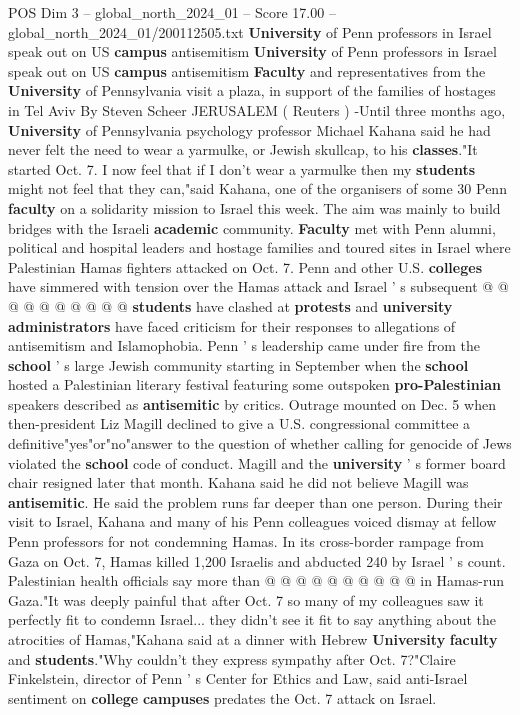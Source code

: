 \begin{textsample}{POS Dim 3 – global\_north\_2024\_01 – Score 17.00 – global\_north\_2024\_01/200112505.txt}  \label{ex:f3_pos_240}
\textbf{University} of Penn professors in Israel speak out on US \textbf{campus} antisemitism \textbf{University} of Penn professors in Israel speak out on US \textbf{campus} antisemitism \textbf{Faculty} and representatives from the \textbf{University} of Pennsylvania visit a plaza, in support of the families of hostages in Tel Aviv By Steven Scheer JERUSALEM ( Reuters ) -Until three months ago, \textbf{University} of Pennsylvania psychology professor Michael Kahana said he had never felt the need to wear a yarmulke, or Jewish skullcap, to his \textbf{classes}."It started Oct. 7.
I now feel that if I don't wear a yarmulke then my \textbf{students} might not feel that they can,"said Kahana, one of the organisers of some 30 Penn \textbf{faculty} on a solidarity mission to Israel this week.
The aim was mainly to build bridges with the Israeli \textbf{academic} community. \textbf{Faculty} met with Penn alumni, political and hospital leaders and hostage families and toured sites in Israel where Palestinian Hamas fighters attacked on Oct. 7.
Penn and other U.S. \textbf{colleges} have simmered with tension over the Hamas attack and Israel ' s subsequent @ @ @ @ @ @ @ @ @ @ \textbf{students} have clashed at \textbf{protests} and \textbf{university} \textbf{administrators} have faced criticism for their responses to allegations of antisemitism and Islamophobia.
Penn ' s leadership came under fire from the \textbf{school} ' s large Jewish community starting in September when the \textbf{school} hosted a Palestinian literary festival featuring some outspoken \textbf{pro-Palestinian} speakers described as \textbf{antisemitic} by critics.
Outrage mounted on Dec. 5 when then-president Liz Magill declined to give a U.S. congressional committee a definitive"yes"or"no"answer to the question of whether calling for genocide of Jews violated the \textbf{school} code of conduct.
Magill and the \textbf{university} ' s former board chair resigned later that month.
Kahana said he did not believe Magill was \textbf{antisemitic}.
He said the problem runs far deeper than one person.
During their visit to Israel, Kahana and many of his Penn colleagues voiced dismay at fellow Penn professors for not condemning Hamas.
In its cross-border rampage from Gaza on Oct. 7, Hamas killed 1,200 Israelis and abducted 240 by Israel ' s count.
Palestinian health officials say more than @ @ @ @ @ @ @ @ @ @ in Hamas-run Gaza."It was deeply painful that after Oct. 7 so many of my colleagues saw it perfectly fit to condemn Israel... they didn't see it fit to say anything about the atrocities of Hamas,"Kahana said at a dinner with Hebrew \textbf{University} \textbf{faculty} and \textbf{students}."Why couldn't they express sympathy after Oct. 7?"Claire Finkelstein, director of Penn ' s Center for Ethics and Law, said anti-Israel sentiment on \textbf{college} \textbf{campuses} predates the Oct. 7 attack on Israel.

\end{textsample}
